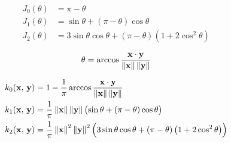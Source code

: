 \begin{align}
    J_0(\theta) &= \pi - \theta \\
    J_1(\theta) &= \sin\theta + \left(\pi - \theta\right)\cos\theta \\
    J_2(\theta) &= 3\sin\theta\cos\theta + \left(\pi - \theta\right)\left(1 + 2\cos^2\theta\right)
\end{align}

\begin{equation}
    \theta = \arccos\frac{\mathbf{x} \cdot \mathbf{y}}{\left\lVert \mathbf{x} \right\rVert \left\lVert \mathbf{y} \right\rVert}
\end{equation}


\begin{align}
    k_0(\mathbf{x},\,\mathbf{y}) &= 1 - \frac{1}{\pi} \arccos\frac{\mathbf{x} \cdot \mathbf{y}}{\left\lVert \mathbf{x} \right\rVert \left\lVert \mathbf{y} \right\rVert} \\
    k_1(\mathbf{x},\,\mathbf{y}) &= \frac{1}{\pi} \left\lVert \mathbf{x} \right\rVert \left\lVert \mathbf{y} \right\rVert
        \bigl( \sin\theta + \left(\pi - \theta\right)\cos\theta \bigr) \\
    k_2(\mathbf{x},\,\mathbf{y}) &= \frac{1}{\pi} \left\lVert \mathbf{x} \right\rVert^2 \left\lVert \mathbf{y} \right\rVert^2
        \Bigl( 3\sin\theta\cos\theta + \left(\pi - \theta\right)\left(1 + 2\cos^2\theta\right) \Bigr)
\end{align}
